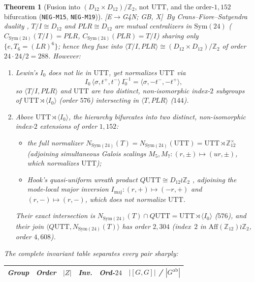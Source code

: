 \documentclass[11pt]{amsart}
\numberwithin{equation}{section}
\theoremstyle{plain}
\newtheorem{theorem}{Theorem}[section]
\theoremstyle{definition}\newtheorem{definition}[theorem]{Definition}
\theoremstyle{remark}\newtheorem{remark}[theorem]{Remark}
\newcommand{\Z}{\mathbb{Z}}
\newcommand{\UTT}{\mathrm{UTT}}
\newcommand{\ctag}[1]{\textup{\textsf{\scriptsize[#1]}}}
\begin{document}
\begin{theorem}[Fusion into $(D_{12}\times D_{12})/\Z_2$, not $\UTT$, and the order-$1{,}152$ bifurcation (\texttt{NEG-M15}, \texttt{NEG-M19})]\label{thm:nonfusion}
\ctag{E$\to$G4N; GB, X}\ By Crans--Fiore--Satyendra duality \cite{cfs2009}, $T/I\cong D_{12}$ and $PLR\cong D_{12}$ are mutual centralizers in $\mathrm{Sym}(24)$ ($C_{\mathrm{Sym}(24)}(T/I)=PLR$, $C_{\mathrm{Sym}(24)}(PLR)=T/I$) sharing only $\{e, T_6=(LR)^6\}$; hence they fuse into $\langle T/I, PLR\rangle\cong (D_{12}\times D_{12})/\Z_2$ of order $24\cdot 24/2 = 288$. However:
\begin{enumerate}[label=(\alph*),nosep]
\item Lewin's $I_0$ does not lie in $\UTT$, yet normalizes $\UTT$ via
\begin{equation}\label{eq:I0_conj}
I_0\,\langle\sigma, t^+, t^-\rangle\,I_0^{-1} = \langle\sigma, -t^-, -t^+\rangle,
\end{equation}
so $\langle T/I, PLR\rangle$ and $\UTT$ are two \emph{distinct, non-isomorphic} index-$2$ subgroups of $\UTT\rtimes\langle I_0\rangle$ (order $576$) intersecting in $\langle T, PLR\rangle$ ($144$).
\item Above $\UTT\rtimes\langle I_0\rangle$, the hierarchy bifurcates into two \emph{distinct, non-isomorphic} index-$2$ extensions of order $1{,}152$:
\begin{itemize}[nosep]
\item the full normalizer $N_{\mathrm{Sym}(24)}(T) = N_{\mathrm{Sym}(24)}(\UTT) = \UTT\rtimes\Z_{12}^\times$ (adjoining simultaneous Galois scalings $M_5,M_7:(r,\pm)\mapsto(ur,\pm)$, which normalizes $\UTT$);
\item Hook's quasi-uniform wreath product $Q\UTT\cong D_{12}\wr\Z_2$ \cite{hook2002}, adjoining the mode-local major inversion $I_{\mathrm{maj}}:(r,+)\mapsto(-r,+)$ and $(r,-)\mapsto(r,-)$, which does \emph{not} normalize $\UTT$.
\end{itemize}
Their exact intersection is $N_{\mathrm{Sym}(24)}(T)\cap Q\UTT = \UTT\rtimes\langle I_0\rangle$ ($576$), and their join $\langle Q\UTT, N_{\mathrm{Sym}(24)}(T)\rangle$ has order $2{,}304$ (index~$2$ in $\mathrm{Aff}(\Z_{12})\wr\Z_2$, order $4{,}608$).
\end{enumerate}
The complete invariant table separates every pair sharply:
\begin{center}\footnotesize\setlength{\tabcolsep}{3.5pt}
\begin{tabular}{lccccc}\toprule
Group & Order & $|Z|$ & Inv. & Ord-$24$ & $|[G,G]|$ / $|G^{\mathrm{ab}}|$ \\\midrule

\end{tabular}
\end{center}
\end{theorem}
\end{document}
